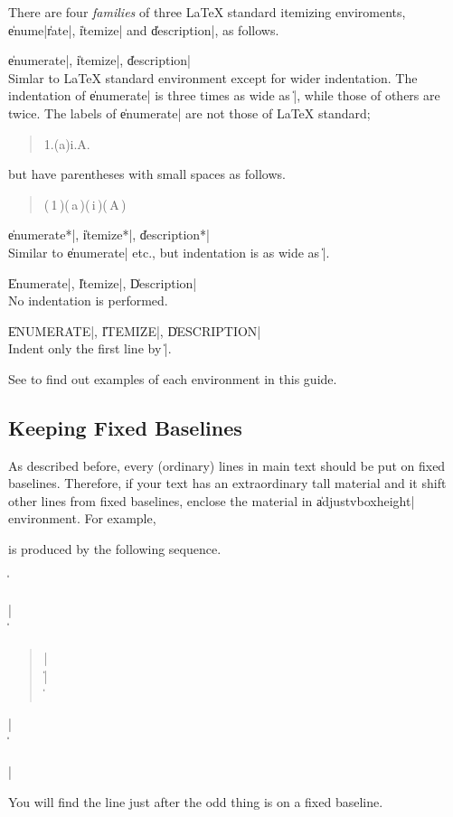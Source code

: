 There are four {\em families} of three {\LaTeX} standard itemizing
enviroments, \|enume|{\tt\-}\|rate|, \|itemize| and \|description|, as follows.
%
\begin{itemize*}
\item \|enumerate|, \|itemize|, \|description|\\
Simlar to {\LaTeX} standard environment except for wider
indentation.  The indentation of \|enumerate| is three times as wide as
\|\parindent|, while those of others are twice.  The labels of \|enumerate|
are not those of {\LaTeX} standard;
%
\begin{quote}
1.\quad (a)\quad i.\quad A.
\end{quote}
%
but have parentheses with small spaces as follows.
%
\begin{quote}
(\,1\,)\quad (\,a\,)\quad (\,i\,)\quad (\,A\,)
\end{quote}

\item \|enumerate*|, \|itemize*|, \|description*|\\
Similar to \|enumerate| etc., but indentation is as wide as
\|\parindent|.

\item \|Enumerate|, \|Itemize|, \|Description|\\
No indentation is performed.

\item \|ENUMERATE|, \|ITEMIZE|, \|DESCRIPTION|\\
Indent only the first line by \|\parindent|.
\end{itemize*}
%
See  to find out examples of each environment in this
guide.


\subsection{Keeping Fixed Baselines}

As described before, every (ordinary) lines in main text should be put on
fixed baselines.  Therefore, if your text has an extraordinary tall material
and it shift other lines from fixed baselines, enclose the material in
\|adjustvboxheight| environment.  For example,
%
\begin{adjustvboxheight}
\begin{quote}
\end{quote}
\end{adjustvboxheight}
%
is produced by the following sequence.
%
\begin{Quote}\small*
\|\begin{adjustvboxheight}|\\
\|\begin{quote}|\\
\||\\
\|\end{quote}|\\
\|\end{adjustvboxheight}|
\end{Quote}
%
You will find the line just after the odd thing is on a fixed baseline.

